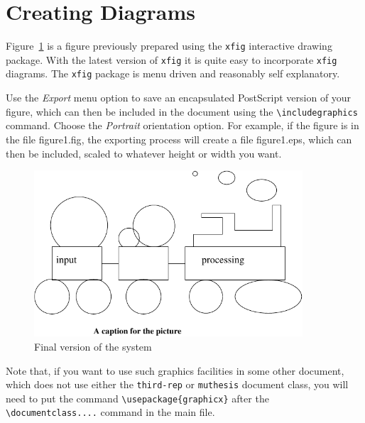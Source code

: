 \section{Creating Diagrams}
\label{sec:diagrams}

Figure~\ref{fig:fig-eg} is a figure previously prepared using the
\texttt{xfig} interactive drawing package. With the latest version of
\texttt{xfig} it is quite easy to incorporate \texttt{xfig} diagrams.
The \texttt{xfig} package is menu driven and reasonably self
explanatory.

Use the \emph{Export} menu option to save an encapsulated PostScript
version of your figure, which can then be included in the document
using the \verb=\includegraphics= command. Choose the \emph{Portrait}
orientation option. For example, if the figure is in the file \textsf{
  figure1.fig}, the exporting process will create a file \textsf{
  figure1.eps}, which can then be included, scaled to whatever height
or width you want.


\begin{figure}
\begin{center}
\includegraphics[width=10cm]{figure1} %
\end{center}
\caption{Final version of the system}
\label{fig:fig-eg}  
\end{figure}

Note that, if you want to use such graphics facilities in some other
document, which does not use either the \texttt{third-rep} or
\texttt{muthesis} document class, you will need to put the command
\verb=\usepackage{graphicx}= after the \verb=\documentclass....=
command in the main file.

